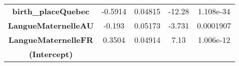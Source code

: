 \documentclass[]{book}
\theoremstyle{definition}
\theoremstyle{definition}
\theoremstyle{remark}
\begin{document}
\begin{longtable}[]{@{}ccccc@{}}
\begin{minipage}[t]{0.30\columnwidth}
\textbf{birth\_placeQuebec}\strut
\end{minipage} & \begin{minipage}[t]{0.13\columnwidth}\centering\strut
-0.5914\strut
\end{minipage} & \begin{minipage}[t]{0.16\columnwidth}\centering\strut
0.04815\strut
\end{minipage} & \begin{minipage}[t]{0.12\columnwidth}\centering\strut
-12.28\strut
\end{minipage} & \begin{minipage}[t]{0.12\columnwidth}\centering\strut
1.108e-34\strut
\end{minipage}\tabularnewline
\begin{minipage}[t]{0.30\columnwidth}\centering\strut
\textbf{LangueMaternelleAU}\strut
\end{minipage} & \begin{minipage}[t]{0.13\columnwidth}\centering\strut
-0.193\strut
\end{minipage} & \begin{minipage}[t]{0.16\columnwidth}\centering\strut
0.05173\strut
\end{minipage} & \begin{minipage}[t]{0.12\columnwidth}\centering\strut
-3.731\strut
\end{minipage} & \begin{minipage}[t]{0.12\columnwidth}\centering\strut
0.0001907\strut
\end{minipage}\tabularnewline
\begin{minipage}[t]{0.30\columnwidth}\centering\strut
\textbf{LangueMaternelleFR}\strut
\end{minipage} & \begin{minipage}[t]{0.13\columnwidth}\centering\strut
0.3504\strut
\end{minipage} & \begin{minipage}[t]{0.16\columnwidth}\centering\strut
0.04914\strut
\end{minipage} & \begin{minipage}[t]{0.12\columnwidth}\centering\strut
7.13\strut
\end{minipage} & \begin{minipage}[t]{0.12\columnwidth}\centering\strut
1.006e-12\strut
\end{minipage}\tabularnewline
\begin{minipage}[t]{0.30\columnwidth}\centering\strut
\textbf{(Intercept)}\strut

\end{minipage}
\end{longtable}
\end{document}
